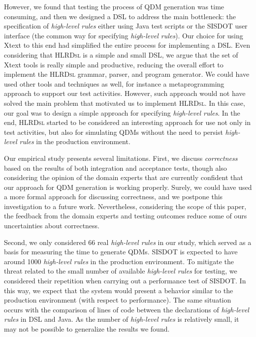 \documentclass{bmcart}
\newcommand{\callers}{\emph{high-level rules}\xspace}
\newcommand{\hlrdsl}{\textsc{HLRDsl}\xspace}
\begin{document}
However, we found that testing the process of QDM generation was time consuming, and then we designed a DSL to address the main bottleneck: the specification of \callers either using Java test scripts or the SISDOT user interface (the common way for specifying \callers). Our choice for using Xtext to this end had simplified the entire process for implementing a DSL. Even considering that \hlrdsl is a simple and small DSL, we argue that the set of Xtext tools is really simple and productive, reducing the overall effort to implement the \hlrdsl grammar, parser, and program generator. We could have used other tools and techniques as well, for instance
a metaprogramming approach to support our test activities. However, such approach would not have solved the main problem that motivated us to implement \hlrdsl. In this case, our goal was to design a simple approach for specifying \callers. In the end, \hlrdsl started to be considered an interesting approach for use not only in test activities, but also for simulating QDMs without the need to persist \callers in the production environment. 

Our empirical study presents several limitations. First, we discuss \emph{correctness} based on the results of both integration and acceptance tests, though also considering the opinion of the domain experts that are currently confident that our approach for QDM generation is working properly. Surely, we could have used a more formal approach for discussing correctness, and we postpone this investigation to a future work. Nevertheless, considering the scope of this paper, the feedback from the domain experts and testing outcomes reduce some of ours uncertainties about correctness. 

Second, we only considered 66 real \callers in our study, which served as a basis for measuring the time to generate QDMs. SISDOT is expected to have around 1000 \callers in the production environment. To mitigate the threat related to the small number of available \callers for testing, we considered their repetition when carrying out a performance test of SISDOT. In this way, we expect that the
system would present a behavior similar to the production environment (with respect to performance). The same situation occurs with the comparison of lines of code between the declarations of \callers in DSL and Java. As the number of \callers is relatively small, 
it may not be possible to generalize the results we found.
\end{document}
